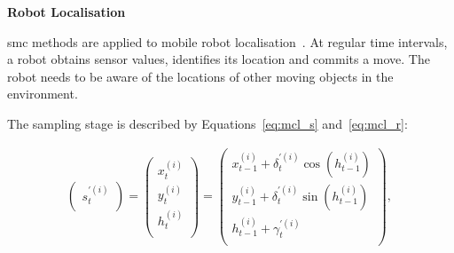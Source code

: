 



\textbf{Robot Localisation}

\gls{smc} methods are applied to mobile robot localisation~\cite{chau14trets,montemerlo02}.
At regular time intervals, a robot obtains sensor values, identifies its location and commits a move.
The robot needs to be aware of the locations of other moving objects in the environment.

The sampling stage is described by Equations~\ref{eq:mcl_s} and~\ref{eq:mcl_r}:

\begin{equation}
\begin{aligned}
  \begin{pmatrix}
    s^{\prime(i)}_t    \\ 
  \end{pmatrix}
  =
  \begin{pmatrix}
    x^{(i)}_t    \\ 
    y^{(i)}_t    \\ 
    h^{(i)}_t    \\ 
  \end{pmatrix}
  =
  \begin{pmatrix}
  	x^{(i)}_{t-1} + \delta^{\prime(i)}_{t} \cos(h^{(i)}_{t-1}) \\
		y^{(i)}_{t-1} + \delta^{\prime(i)}_{t} \sin(h^{(i)}_{t-1}) \\
		h^{(i)}_{t-1} + \gamma^{\prime(i)}_{t} \\
  \end{pmatrix}
	\mbox{, }
\end{aligned}
\label{eq:mcl_s}
\end{equation}

